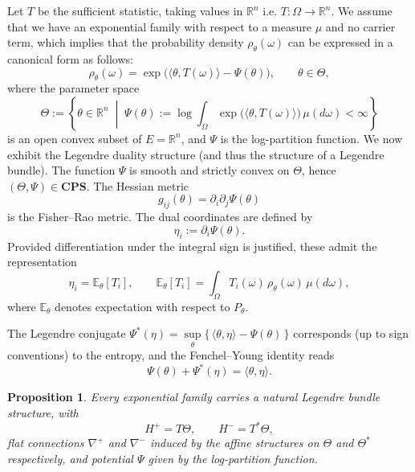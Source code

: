 \documentclass[12pt]{amsart}
\newtheorem{prop}{Proposition}
\begin{document}
Let $T$ be the sufficient statistic, taking values in $\mathbb{R}^n$ i.e. $T\colon {\Omega}\to \mathbb{R}^n$.
We assume that we have an exponential family with respect to a measure $\mu$ and no carrier term, which implies that the probability density $\rho_{\theta}(\omega)$ can be expressed in a canonical form as follows: 
\[
\rho_{\theta}(\omega) = \exp\bigl(\langle \theta, T(\omega) \rangle - \Psi(\theta)\bigr), 
\qquad \theta \in \Theta,
\]
where the parameter space
\[
\Theta := \left\{ \theta \in \mathbb{R}^n \;\middle|\; 
\Psi(\theta) := \log \int_{\Omega} \exp\bigl(\langle \theta, T(\omega) \rangle\bigr)\, \mu(d\omega) < \infty \right\}
\]
is an open convex subset of $E = \mathbb{R}^n$, and $\Psi$ is the log-partition function. 
We now exhibit the Legendre duality structure (and thus the structure of a Legendre bundle). The function $\Psi$ is smooth and strictly convex on $\Theta$, hence $(\Theta, \Psi) \in \mathbf{CPS}$. The Hessian metric
\[
g_{ij}(\theta) = \partial_i \partial_j \Psi(\theta)
\]
is the Fisher--Rao metric. The dual coordinates are defined by
\[
\eta_i := \partial_i \Psi(\theta).
\]
Provided differentiation under the integral sign is justified, these admit the representation
\[
\eta_i = \mathbb{E}_\theta[T_i],
\qquad
\mathbb{E}_\theta[T_i]
= \int_{\Omega} T_i(\omega)\, \rho_{\theta}(\omega)\, \mu(d\omega),
\]
where $\mathbb{E}_\theta$ denotes expectation with respect to $P_\theta$.

The Legendre conjugate $\Psi^*(\eta)=\sup\limits_\theta\{\, \langle \theta,\eta\rangle -\Psi(\theta)\, \}$ corresponds (up to sign conventions) to the entropy, and the Fenchel--Young identity reads
\[
\Psi(\theta) + \Psi^*(\eta) = \langle \theta, \eta \rangle.
\]

\begin{prop}
Every exponential family carries a natural Legendre bundle structure, with
\[
H^+ = T\Theta, \qquad H^- = T^*\Theta,
\]
flat connections $\nabla^+$ and $\nabla^-$ induced by the affine structures on $\Theta$ and $\Theta^*$ respectively, and potential $\Psi$ given by the log-partition function.
\end{prop}
\end{document}
